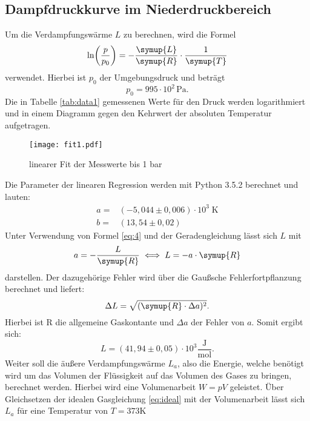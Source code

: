 \subsection{Dampfdruckkurve im Niederdruckbereich}
Um die Verdampfungswärme $L$ zu berechnen, wird die Formel
\begin{equation*}
  \ln \biggl(\frac{p}{p_0}\biggr)=-\frac{\symup{L}}{\symup{R}} \cdot \frac{1}{\symup{T}}
\end{equation*}
verwendet. Hierbei ist $p_0$ der Umgebungsdruck und beträgt
\begin{equation*}
  p_0=995\cdot 10^2 \,\si{\pascal}.
\end{equation*}
Die in Tabelle \ref{tab:data1} gemessenen Werte für den Druck werden logarithmiert und in einem
Diagramm gegen den Kehrwert der absoluten Temperatur aufgetragen.

\begin{figure}[H]
  \centering
  \texttt{[image: fit1.pdf]}
  \caption{linearer Fit der Messwerte bis 1 bar}
  \label{fig:fit1}
  \end{figure}
Die Parameter der linearen Regression werden mit Python 3.5.2 berechnet und
lauten:
\begin{align*}
  a =& (-5,044 \pm 0,006) \cdot 10^3 \; \si{\kelvin} \\
  b =& (13,54 \pm 0,02)
\end{align*}
Unter Verwendung von Formel \eqref{eq:4} und der Geradengleichung
lässt sich $L$ mit
\begin{equation}
  a=-\frac{L}{\symup{R}} \iff L = -a \cdot \symup{R}
\end{equation}
darstellen. Der dazugehörige Fehler wird über die Gaußsche Fehlerfortpflanzung
berechnet und liefert:
\begin{equation}
  \Delta L = \sqrt{(\symup{R} \cdot \Delta a)^2}.
  \label{eqn:fehler}
\end{equation}
Hierbei ist R die allgemeine Gaskontante und $\Delta a$ der Fehler von $a$.
Somit ergibt sich:
\begin{equation*}
  L=(41,94 \pm 0,05)\cdot 10^3 \frac{\si{\joule}}{\si{\mol}}.
\end{equation*}
Weiter soll die äußere Verdampfungswärme $L_a$, also die Energie, welche
benötigt wird um das Volumen der Flüssigkeit auf das Volumen des Gases
zu bringen, berechnet werden. Hierbei wird eine Volumenarbeit $W=pV$ geleistet.
Über Gleichsetzen der idealen Gasgleichung \eqref{eq:ideal} mit der
Volumenarbeit lässt sich $L_a$ für eine Temperatur von $T=373 \si{\kelvin}$
